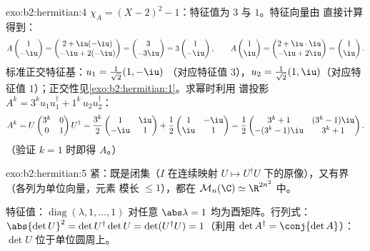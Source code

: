 \begin{solution}{exo:b2:hermitian:4}
$\chi_A = (X-2)^2 - 1$：特征值为 $3$ 与 $1$。特征向量由
直接计算得到：
\[
A\begin{pmatrix}1\\ -\iu\end{pmatrix}
= \begin{pmatrix} 2 + \iu(-\iu)\\ -\iu + 2(-\iu)\end{pmatrix}
= \begin{pmatrix} 3\\ -3\iu \end{pmatrix}
= 3\begin{pmatrix}1\\ -\iu\end{pmatrix},
\qquad
A\begin{pmatrix}1\\ \iu\end{pmatrix}
= \begin{pmatrix} 2 + \iu\cdot\iu\\ -\iu + 2\iu\end{pmatrix}
= \begin{pmatrix}1\\ \iu\end{pmatrix}.
\]
标准正交特征基：$u_1 = \frac{1}{\sqrt2}(1, -\iu)$
（对应特征值 $3$），$u_2 = \frac{1}{\sqrt2}(1, \iu)$（对应特征值
$1$）；正交性见\cref{exo:b2:hermitian:1}。求幂时利用
谱投影 $A^k = 3^k u_1u_1^\dagger + 1^k\,
u_2u_2^\dagger$：
\[
A^k = U\begin{pmatrix} 3^k & 0\\ 0 & 1\end{pmatrix}U^\dagger
= \frac{3^k}{2}\begin{pmatrix} 1 & \iu\\ -\iu & 1\end{pmatrix}
+ \frac{1}{2}\begin{pmatrix} 1 & -\iu\\ \iu & 1\end{pmatrix}
= \frac12\begin{pmatrix}
3^k + 1 & (3^k - 1)\iu\\
-(3^k-1)\iu & 3^k + 1
\end{pmatrix}.
\]
（验证 $k = 1$ 时即得 $A$。）
\end{solution}

\begin{solution}{exo:b2:hermitian:5}
紧：既是闭集（$I$ 在连续映射 $U \mapsto
U^\dagger U$ 下的原像），又有界（各列为单位向量，元素
模长 $\leq 1$），都在 $\mathcal{M}_n(\C) \simeq \R^{2n^2}$ 中。

特征值：$\operatorname{diag}(\lambda, 1, \dots, 1)$
对任意 $\abs\lambda = 1$ 均为酉矩阵。行列式：$\abs{\det U}^2 = \det
U^\dagger \det U = \det(U^\dagger U) = 1$（利用 $\det A^\dagger =
\conj{\det A}$）：$\det U$ 位于单位圆周上。
\end{solution}

